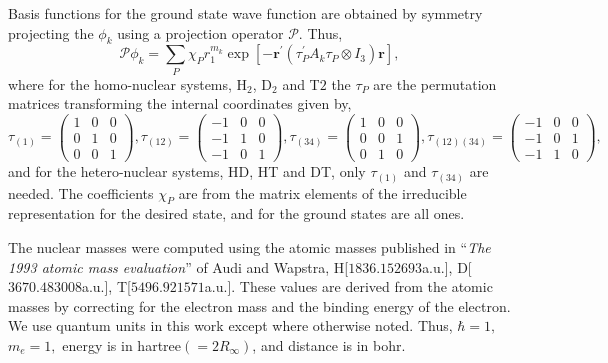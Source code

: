 Basis functions for the ground state wave function are obtained by
symmetry projecting the $\phi _k$ using a projection operator
$\mathcal{P}$. Thus,
\begin{equation}
{\mathcal{P}} \phi_{k} = \sum_{P} \chi_{P} r_{1}^{m_{k}} 
   \exp \left[-\mathbf{r}^{\prime} \left( \tau_{P}^{\prime} A_{k} \tau_{P}
                                 \otimes I_{3} \right) \mathbf{r} \right],
\end{equation}
where for the homo-nuclear systems, H$_2$, D$_2$ and T$2$ the
$\tau_{P}$ are the permutation matrices transforming the internal
coordinates given by,
\begin{equation}
\tau_{(1)}=
\left( 
\begin{array}{ccc}
1 & 0 & 0 \\ 
0 & 1 & 0 \\
0 & 0 & 1
\end{array} 
\right),
\tau_{(12)}=
\left( 
\begin{array}{ccc}
-1 & 0 & 0 \\ 
-1 & 1 & 0 \\
-1 & 0 & 1
\end{array} 
\right),
\tau_{(34)}=
\left( 
\begin{array}{ccc}
1 & 0 & 0 \\ 
0 & 0 & 1 \\
0 & 1 & 0
\end{array} 
\right),
\tau_{(12)(34)}=
\left( 
\begin{array}{ccc}
-1 & 0 & 0 \\ 
-1 & 0 & 1 \\
-1 & 1 & 0
\end{array} 
\right),
\end{equation}
and for the hetero-nuclear systems, HD, HT and DT, only $\tau_{(1)}$ and
$\tau_{(34)}$ are needed. The coefficients $\chi_{P}$ are from the
matrix elements of the irreducible representation for the desired
state, and for the ground states are all ones.

The nuclear masses were computed using the atomic masses published in
``\emph{The 1993 atomic mass evaluation}'' of Audi and
Wapstra\cite{Audi93}, H[$1836.152693$a.u.], D[$3670.483008$a.u.],
T[$5496.921571$a.u.]. These values are derived from the atomic masses
by correcting for the electron mass and the binding energy of the
electron.  We use quantum units in this work except where otherwise
noted. Thus, $\hbar =1,$ $m_e=1,$ energy is in hartree$\left(
  =2R_\infty \right) $, and distance is in bohr.

